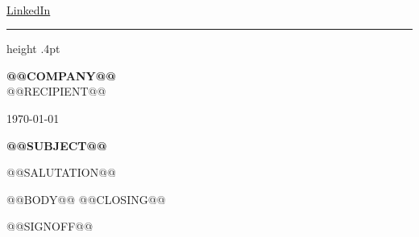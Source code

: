 \documentclass[11pt,a4paper]{article}
\begin{document}
\justifying
{\fontsize{23}{26}\selectfont\textbf{\CVName}\par}
\vspace{-4pt}
{\fontsize{9}{12}\selectfont
\CVLocationIntl\quad\CVPhone\quad\href{\CVEmailURL}{\CVEmail}\\
\href{\CVWebsiteURL}{\CVWebsiteLabel}\quad
\href{\CVGithubURL}{\CVGithubLabel}\quad
\href{\CVLinkedInURL}{LinkedIn}\par}
\vspace{10pt}
\hrule height .4pt
\vspace{12pt}
{\fontsize{10}{13}\selectfont\textbf{@@COMPANY@@}\\@@RECIPIENT@@\par}
{\fontsize{10}{13}\selectfont\today\par}
\vspace{4pt}
\textbf{@@SUBJECT@@}\par
\vspace{3pt}
\fontsize{10.5}{14}\selectfont
@@SALUTATION@@\par
@@BODY@@
@@CLOSING@@\par
\vspace{5pt}
@@SIGNOFF@@\par
\textbf{\CVName}
\end{document}

